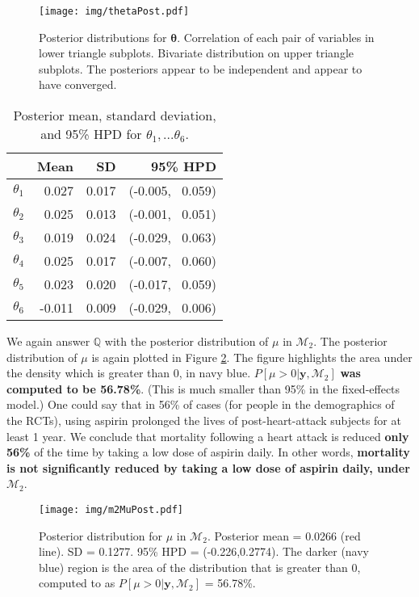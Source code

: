 \documentclass{../../tex_template/asaproc}
\newcommand{\bk}[1]{\left[#1\right]}
\newcommand{\M}{\mathcal{M}}
\newcommand{\Q}{\mathbb{Q}}
\begin{document}
\begin{figure}[H]
  \texttt{[image: img/thetaPost.pdf]}
  \caption{Posterior distributions for $\bm\theta$. Correlation of each pair of
  variables in lower triangle subplots. Bivariate distribution on upper triangle
  subplots. The posteriors appear to be independent and appear to have converged.}
  \label{fig:thetaPost}
\end{figure}

%
\begin{table}[ht]
\centering
\begin{tabular}{rrrr}
  \hline
 & Mean & SD & 95\% HPD \\ 
  \hline
  $\theta_1$ & 0.027 & 0.017 & (-0.005,~ 0.059) \\ 
  $\theta_2$ & 0.025 & 0.013 & (-0.001,~ 0.051) \\ 
  $\theta_3$ & 0.019 & 0.024 & (-0.029,~ 0.063) \\ 
  $\theta_4$ & 0.025 & 0.017 & (-0.007,~ 0.060) \\ 
  $\theta_5$ & 0.023 & 0.020 & (-0.017,~ 0.059) \\ 
  $\theta_6$ &-0.011 & 0.009 & (-0.029,~ 0.006) \\ 
   \hline
\end{tabular}
\caption{Posterior mean, standard deviation, and 95\% HPD for
$\theta_1,...\theta_6$.}
\label{tab:thetaPost}
\end{table}

We again answer $\Q$ with the posterior distribution of $\mu$ in $\M_2$.  The
posterior distribution of $\mu$ is again plotted in Figure \ref{fig:m2MuPost}.
The figure highlights the area under the density which is greater than 0, in
navy blue. $P\bk{\mu>0|\bm{y},\M_2}$ \textbf{was computed to be 56.78\%}. (This
is much smaller than 95\% in the fixed-effects model.) One could say that in
56\% of cases (for people in the demographics of the RCTs), using aspirin
prolonged the lives of post-heart-attack subjects for at least 1 year.  We
conclude that mortality following a heart attack is reduced \textbf{only 56\%}
of the time by taking a low dose of aspirin daily. In other words,
\textbf{mortality is not significantly reduced by taking a low dose of
aspirin daily, under} $\M_2$.

\begin{figure}[H]
  \texttt{[image: img/m2MuPost.pdf]}
  \caption{ Posterior distribution for $\mu$ in $\M_2$. Posterior mean = 0.0266
    (red line). SD = 0.1277. 95\% HPD = (-0.226,0.2774). The darker (navy
    blue) region is the area of the distribution that is greater than 0,
    computed to as $P\bk{\mu>0|\bm{y},\M_2}$ = 56.78\%.}
  \label{fig:m2MuPost}
\end{figure}
\end{document}
